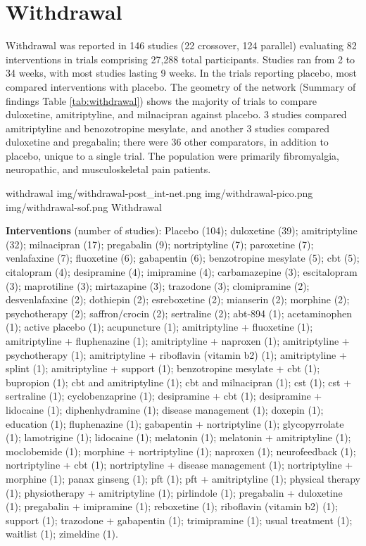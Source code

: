 \documentclass{report}\usepackage[]{graphicx}\usepackage[]{color}
\begin{document}
\section{Withdrawal}

Withdrawal was reported in 146 studies (22 crossover, 124 parallel) evaluating 82 interventions in trials comprising 27,288 total participants. Studies ran from 2 to 34 weeks, with most studies lasting 9 weeks. In the trials reporting placebo, most compared interventions with placebo. The geometry of the network (Summary of findings Table \ref{tab:withdrawal}) shows the majority of trials to compare duloxetine, amitriptyline, and milnacipran against placebo. 3 studies compared amitriptyline and benozotropine mesylate, and another 3 studies compared duloxetine and pregabalin; there were 36 other comparators, in addition to placebo, unique to a single trial. The population were primarily fibromyalgia, neuropathic, and musculoskeletal pain patients.

\soffignew
{withdrawal}
{img/withdrawal-post_int-net.png}
{img/withdrawal-pico.png}
{img/withdrawal-sof.png}
{Withdrawal}

\textbf{Interventions} (number of studies): Placebo (104); duloxetine (39); amitriptyline (32); milnacipran (17); pregabalin (9); nortriptyline (7); paroxetine (7); venlafaxine (7); fluoxetine (6); gabapentin (6); benzotropine mesylate (5); cbt (5); citalopram (4); desipramine (4); imipramine (4); carbamazepine (3); escitalopram (3); maprotiline (3); mirtazapine (3); trazodone (3); clomipramine (2); desvenlafaxine (2); dothiepin (2); esreboxetine (2); mianserin (2); morphine (2); psychotherapy (2); saffron/crocin (2); sertraline (2); abt-894 (1); acetaminophen (1); active placebo (1); acupuncture (1); amitriptyline + fluoxetine (1); amitriptyline + fluphenazine (1); amitriptyline + naproxen (1); amitriptyline + psychotherapy (1); amitriptyline + riboflavin (vitamin b2) (1); amitriptyline + splint (1); amitriptyline + support (1); benzotropine mesylate + cbt (1); bupropion (1); cbt and amitriptyline (1); cbt and milnacipran (1); cst (1); cst + sertraline (1); cyclobenzaprine (1); desipramine + cbt (1); desipramine + lidocaine (1); diphenhydramine (1); disease management (1); doxepin (1); education (1); fluphenazine (1); gabapentin + nortriptyline (1); glycopyrrolate (1); lamotrigine (1); lidocaine (1); melatonin (1); melatonin + amitriptyline (1); moclobemide (1); morphine + nortriptyline (1); naproxen (1); neurofeedback (1); nortriptyline + cbt (1); nortriptyline + disease management (1); nortriptyline + morphine (1); panax ginseng (1); pft (1); pft + amitriptyline (1); physical therapy (1); physiotherapy + amitriptyline (1); pirlindole (1); pregabalin + duloxetine (1); pregabalin + imipramine (1); reboxetine (1); riboflavin (vitamin b2) (1); support (1); trazodone + gabapentin (1); trimipramine (1); usual treatment (1); waitlist (1); zimeldine (1).
\end{document}
